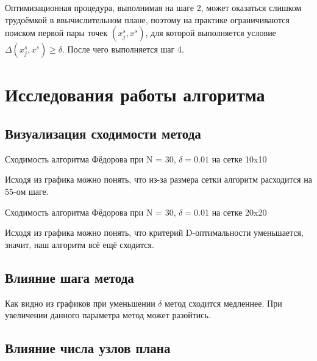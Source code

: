 Оптимизационная процедура, выполнимая на шаге 2, может оказаться слишком трудоёмкой 
в ввычислительном плане, поэтому на практике ограничиваются поиском первой пары точек
$ \left( x_j^s, x^s \right) $, для которой выполняется условие 
$ \Delta \left( x_j^s, x^s \right) \geq \delta $. После чего выполняется шаг 4.


\section{Исследования работы алгоритма}


\subsection{Визуализация сходимости метода}

Сходимость алгоритма Фёдорова при N = 30, $\delta = 0.01$ на сетке 10x10

Исходя из графика можно понять, что из-за размера сетки алгоритм расходится на 55-ом шаге.
\vspace{30mm}



Сходимость алгоритма Фёдорова при N = 30, $\delta = 0.01$ на сетке 20x20


Исходя из графика можно понять, что критерий D-оптимальности уменьшается, значит, наш алгоритм всё ещё сходится.
\vspace{30mm}


\subsection{Влияние шага метода}

Как видно из графиков при уменьшении $\delta$ метод сходится медленнее.
При увеличении данного параметра метод может разойтись.


\subsection{Влияние числа узлов плана}

